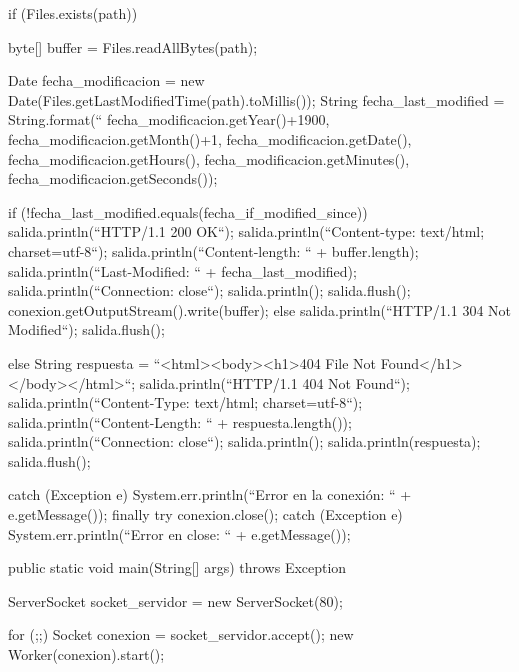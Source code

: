 \begin{SourceCode}
{{{{{	        if (Files.exists(path))
	        {
	          byte[] buffer = Files.readAllBytes(path);

	          Date fecha_modificacion = new Date(Files.getLastModifiedTime(path).toMillis());
	          String fecha_last_modified = String.format(``%
						  fecha_modificacion.getYear()+1900,
						  fecha_modificacion.getMonth()+1,
						  fecha_modificacion.getDate(),
						  fecha_modificacion.getHours(),
						  fecha_modificacion.getMinutes(),
						  fecha_modificacion.getSeconds());

	          if (!fecha_last_modified.equals(fecha_if_modified_since))
	          {
              salida.println(``HTTP/1.1 200 OK``);
              salida.println(``Content-type: text/html; charset=utf-8``);
              salida.println(``Content-length: `` + buffer.length);
              salida.println(``Last-Modified: `` + fecha_last_modified);
              salida.println(``Connection: close``);
              salida.println();
              salida.flush();
	            conexion.getOutputStream().write(buffer);
	          }
	          else
	          {
              salida.println(``HTTP/1.1 304 Not Modified``);
              salida.flush();
	          }
	        }
	        else
	        {
	          String respuesta = ``<html><body><h1>404 File Not Found</h1></body></html>``;
	          salida.println(``HTTP/1.1 404 Not Found``);
	          salida.println(``Content-Type: text/html; charset=utf-8``);
	          salida.println(``Content-Length: `` + respuesta.length());
	          salida.println(``Connection: close``);
	          salida.println();
	          salida.println(respuesta);
	          salida.flush();
	        }
        }
      }
      catch (Exception e)
      {
        System.err.println(``Error en la conexión: `` + e.getMessage());
      }
      finally
      {
        try
        {
          conexion.close();
        }
        catch (Exception e)
        {
          System.err.println(``Error en close: `` + e.getMessage());
        }
      }
    }
  }

  public static void main(String[] args) throws Exception
  {
    ServerSocket socket_servidor = new ServerSocket(80);

    for (;;)
    {
      Socket conexion = socket_servidor.accept();
      new Worker(conexion).start();
    }
  }
}
\end{SourceCode}

